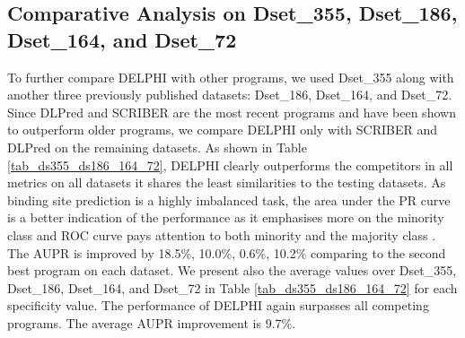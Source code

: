 \subsection{Comparative Analysis on Dset\_355, Dset\_186, Dset\_164, and Dset\_72}
To further compare DELPHI with other programs, we used Dset\_355 along with another three previously published datasets: Dset\_186, Dset\_164, and Dset\_72. Since DLPred and SCRIBER are the most recent programs and have been shown to outperform older programs, we compare DELPHI only with SCRIBER and DLPred on the remaining datasets. As shown in Table \ref{tab_ds355_ds186_164_72}, DELPHI clearly outperforms the competitors in all metrics on all datasets it shares the least similarities to the testing datasets. As binding site prediction is a highly imbalanced task, the area under the PR curve is a better indication of the performance as it emphasises more on the minority class and ROC curve pays attention to both minority and the majority class \cite{andluis2016survey}. The AUPR is improved by 18.5\%, 10.0\%, 0.6\%, 10.2\% comparing to the second best program on each dataset. We present also the average values over Dset\_355, Dset\_186, Dset\_164, and Dset\_72 in Table \ref{tab_ds355_ds186_164_72} for each specificity value. The performance of DELPHI again surpasses all competing programs. The average AUPR improvement is 9.7\%.  
